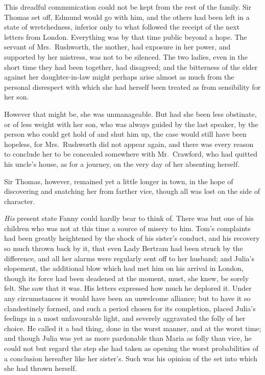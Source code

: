 \documentclass{article}
\begin{document}
This dreadful communication could not be kept from the rest
of the family.  Sir Thomas set off, Edmund would go with him,
and the others had been left in a state of wretchedness,
inferior only to what followed the receipt of the next
letters from London.  Everything was by that time public
beyond a hope.  The servant of Mrs.\ Rushworth, the mother,
had exposure in her power, and supported by her mistress,
was not to be silenced.  The two ladies, even in the short
time they had been together, had disagreed; and the bitterness
of the elder against her daughter-in-law might perhaps arise
almost as much from the personal disrespect with which
she had herself been treated as from sensibility for her son.

However that might be, she was unmanageable.  But had she
been less obstinate, or of less weight with her son,
who was always guided by the last speaker, by the person
who could get hold of and shut him up, the case would
still have been hopeless, for Mrs.\ Rushworth did not
appear again, and there was every reason to conclude
her to be concealed somewhere with Mr.\ Crawford,
who had quitted his uncle's house, as for a journey,
on the very day of her absenting herself.

Sir Thomas, however, remained yet a little longer in town,
in the hope of discovering and snatching her from farther vice,
though all was lost on the side of character.

\emph{His} present state Fanny could hardly bear to think of.
There was but one of his children who was not at this time
a source of misery to him.  Tom's complaints had been
greatly heightened by the shock of his sister's conduct,
and his recovery so much thrown back by it, that even
Lady Bertram had been struck by the difference, and all
her alarms were regularly sent off to her husband;
and Julia's elopement, the additional blow which had met
him on his arrival in London, though its force had been
deadened at the moment, must, she knew, be sorely felt.
She saw that it was.  His letters expressed how much he
deplored it.  Under any circumstances it would have been
an unwelcome alliance; but to have it so clandestinely
formed, and such a period chosen for its completion,
placed Julia's feelings in a most unfavourable light,
and severely aggravated the folly of her choice.
He called it a bad thing, done in the worst manner,
and at the worst time; and though Julia was yet as more
pardonable than Maria as folly than vice, he could not
but regard the step she had taken as opening the worst
probabilities of a conclusion hereafter like her sister's.
Such was his opinion of the set into which she had
thrown herself.
\end{document}
